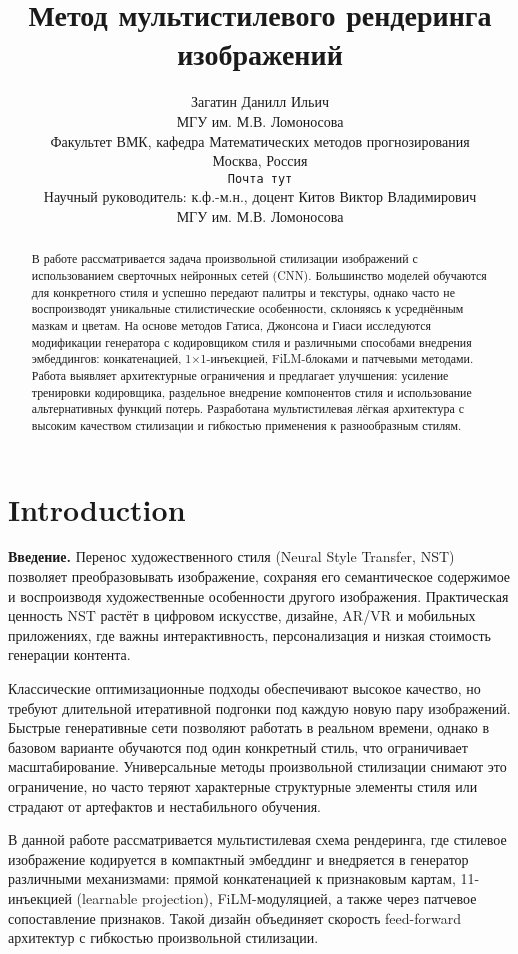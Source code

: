\documentclass{article}
\title{Метод мультистилевого рендеринга изображений}
\author{
  Загатин Данилл Ильич \\
  МГУ им. М.В. Ломоносова \\
  Факультет ВМК, кафедра Математических методов прогнозирования \\
  Москва, Россия \\
  \texttt{Почта тут} \\
  \And
  Научный руководитель: к.ф.-м.н., доцент Китов Виктор Владимирович \\
  МГУ им. М.В. Ломоносова
}
\date{}
\begin{document}
\maketitle

\begin{abstract}
В работе рассматривается задача произвольной стилизации изображений с использованием сверточных нейронных сетей (CNN). Большинство моделей обучаются для конкретного стиля и успешно передают палитры и текстуры, однако часто не воспроизводят уникальные стилистические особенности, склоняясь к усреднённым мазкам и цветам. На основе методов Гатиса, Джонсона и Гиаси исследуются модификации генератора с кодировщиком стиля и различными способами внедрения эмбеддингов: конкатенацией, 1×1-инъекцией, FiLM-блоками и патчевыми методами. Работа выявляет архитектурные ограничения и предлагает улучшения: усиление тренировки кодировщика, раздельное внедрение компонентов стиля и использование альтернативных функций потерь. Разработана мультистилевая лёгкая архитектура с высоким качеством стилизации и гибкостью применения к разнообразным стилям.
\end{abstract}


\section{Introduction}
\textbf{Введение.}
Перенос художественного стиля (Neural Style Transfer, NST) позволяет преобразовывать изображение, сохраняя его семантическое содержимое и воспроизводя художественные особенности другого изображения. Практическая ценность NST растёт в цифровом искусстве, дизайне, AR/VR и мобильных приложениях, где важны интерактивность, персонализация и низкая стоимость генерации контента.

Классические оптимизационные подходы обеспечивают высокое качество, но требуют длительной итеративной подгонки под каждую новую пару изображений. Быстрые генеративные сети позволяют работать в реальном времени, однако в базовом варианте обучаются под один конкретный стиль, что ограничивает масштабирование. Универсальные методы произвольной стилизации снимают это ограничение, но часто теряют характерные структурные элементы стиля или страдают от артефактов и нестабильного обучения.

В данной работе рассматривается мультистилевая схема рендеринга, где стилевое изображение кодируется в компактный эмбеддинг и внедряется в генератор различными механизмами: прямой конкатенацией к признаковым картам, 1{\texttimes}1-инъекцией (learnable projection), FiLM-модуляцией, а также через патчевое сопоставление признаков. Такой дизайн объединяет скорость feed-forward архитектур с гибкостью произвольной стилизации.
\end{document}
